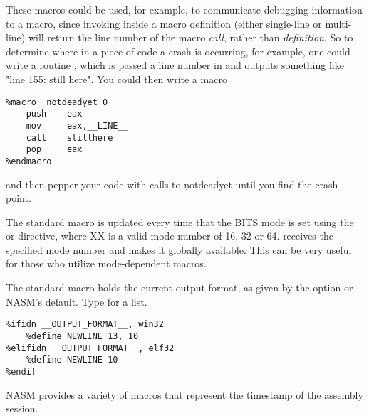 These macros could be used, for example, to communicate debugging
information to a macro, since invoking  inside a macro
definition (either single-line or multi-line) will return the line
number of the macro \emph{call}, rather than \emph{definition}. So to
determine where in a piece of code a crash is occurring, for example,
one could write a routine , which is passed a line number
in  and outputs something like "line 155: still here".
You could then write a macro

\begin{lstlisting}
%macro  notdeadyet 0
    push    eax
    mov     eax,__LINE__
    call    stillhere
    pop     eax
%endmacro
\end{lstlisting}

and then pepper your code with calls to \c{notdeadyet} until you
find the crash point.


The  standard macro is updated every time that the BITS
mode is set using the  or \code{[BITS XX]} directive,
where XX is a valid mode number of 16, 32 or 64.  receives
the specified mode number and makes it globally available. This can be very
useful for those who utilize mode-dependent macros.


The  standard macro holds the current output format,
as given by the  option or NASM's default. Type  for a
list.

\begin{lstlisting}
%ifidn __OUTPUT_FORMAT__, win32
    %define NEWLINE 13, 10
%elifidn __OUTPUT_FORMAT__, elf32
    %define NEWLINE 10
%endif
\end{lstlisting}


NASM provides a variety of macros that represent the timestamp of the
assembly session.

